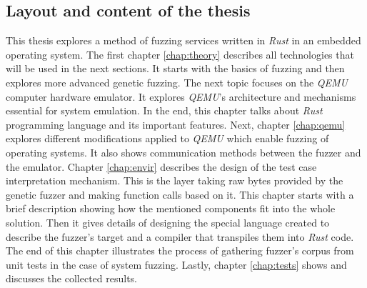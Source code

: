 \subsection{Layout and content of the thesis}
This thesis explores a method of fuzzing services written in \textit{Rust} in an embedded operating system. The first chapter \ref{chap:theory} describes all technologies that will be used in the next sections. It starts with the basics of fuzzing and then explores more advanced genetic fuzzing. The next topic focuses on the \textit{QEMU} computer hardware emulator. It explores \textit{QEMU}'s architecture and mechanisms essential for system emulation. In the end, this chapter talks about \textit{Rust} programming language and its important features. Next, chapter \ref{chap:qemu} explores different modifications applied to \textit{QEMU} which enable fuzzing of operating systems. It also shows communication methods between the fuzzer and the emulator. Chapter \ref{chap:envir} describes the design of the test case interpretation mechanism. This is the layer taking raw bytes provided by the genetic fuzzer and making function calls based on it. This chapter starts with a brief description showing how the mentioned components fit into the whole solution. Then it gives details of designing the special language created to describe the fuzzer's target and a compiler that transpiles them into \textit{Rust} code. The end of this chapter illustrates the process of gathering fuzzer's corpus from unit tests in the case of system fuzzing. Lastly, chapter \ref{chap:tests} shows and discusses the collected results.
